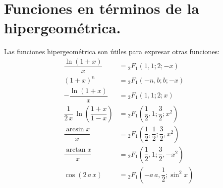 \section{Funciones en términos de la hipergeométrica.}
Las funciones hipergeométrica son útiles para expresar otras funciones:
\begin{align*}
\dfrac{\ln (1 + x)}{x} &= {}_{2} F_{1}(1, 1; 2; -x) \\[1em]
(1 + x)^{n} &= {}_{2} F_{1}(-n, b; b; -x) \\[1em]
- \dfrac{\ln (1 + x)}{x} &= {}_{2} F_{1}(1, 1; 2; x) \\[1em]
\dfrac{1}{2 \, x} \, \ln \left( \dfrac{1 + x}{1 - x} \right)&= {}_{2} F_{1}\left( \dfrac{1}{2}, 1; \dfrac{3}{2}; x^{2} \right) \\[1em]
\dfrac{\arcsin x}{x} &= {}_{2} F_{1} \left( \dfrac{1}{2}, \dfrac{1}{2}; \dfrac{3}{2}, x^{2} \right) \\[1em]
\dfrac{\arctan x}{x} &= {}_{2} F_{1} \left( \dfrac{1}{2}, 1; \dfrac{3}{2}, -x^{2} \right) \\[1em]
\cos (2 \, a \, x) &= {}_{2} F_{1} \left( -a \, a, \dfrac{1}{2}; \sin^{2} x \right)
\end{align*}
